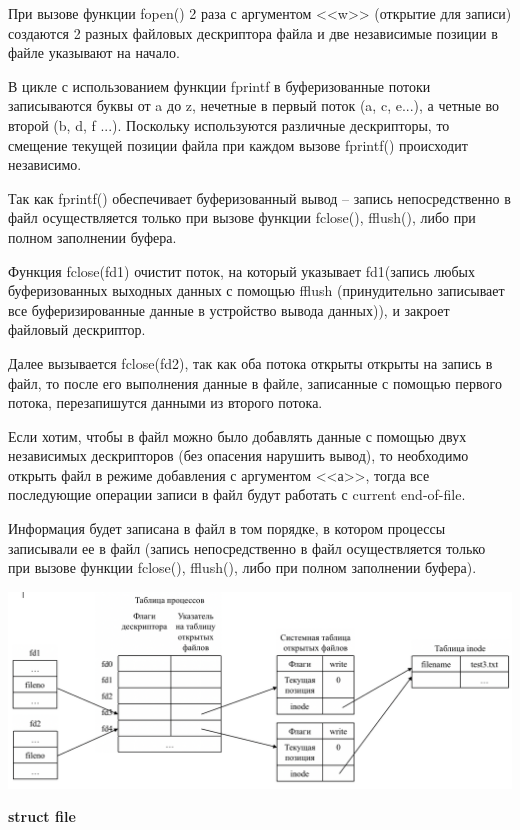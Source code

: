 \documentclass[a4paper,14pt]{extreport} %
\begin{document}
При вызове функции fopen() 2 раза с аргументом <<w>> (открытие для записи) создаются 2 разных файловых дескриптора файла и две независимые позиции в файле указывают на начало. 

В цикле с использованием функции fprintf в буферизованные потоки записываются буквы от a до z, нечетные в первый поток (a, c, e...), а четные во второй (b, d, f ...). Поскольку используются различные дескрипторы, то смещение текущей позиции файла при каждом вызове fprintf() происходит независимо.

Так как fprintf() обеспечивает буферизованный вывод -- запись непосредственно в файл осуществляется только при вызове функции fclose(), fflush(), либо при полном заполнении буфера.

Функция fclose(fd1) очистит поток, на который указывает fd1(запись любых буферизованных выходных данных с помощью fflush (принудительно записывает все буферизированные данные в устройство вывода данных)), и закроет файловый дескриптор.

Далее вызывается fclose(fd2), так как оба потока открыты открыты на запись в файл, то после его выполнения данные в файле, записанные с помощью первого потока, перезапишутся данными из второго потока. 

\hfill

Если хотим, чтобы в файл можно было добавлять данные с помощью двух независимых дескрипторов (без опасения нарушить вывод), то необходимо открыть файл в режиме добавления с аргументом <<а>>, тогда все последующие операции записи в файл будут работать с current end-of-file. 

Информация будет записана в файл в том порядке, в котором процессы записывали ее в файл (запись непосредственно в файл осуществляется только при вызове функции fclose(), fflush(), либо при полном заполнении буфера).

\includegraphics[scale=0.6]{shema3}

\newpage

\textbf{struct file}
\end{document}
